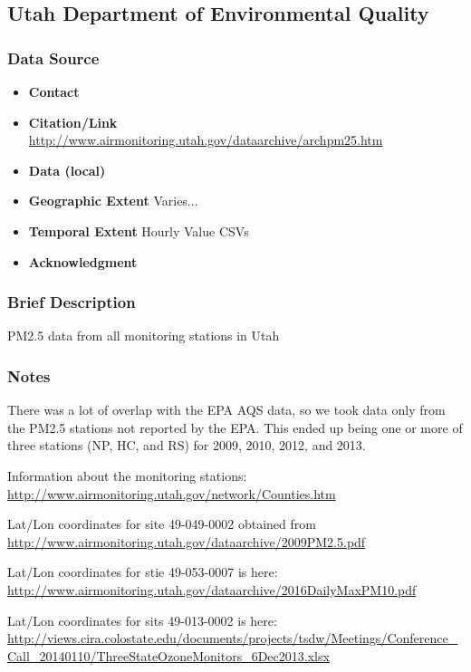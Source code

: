 \subsection{Utah Department of Environmental Quality }

\subsubsection*{Data Source}

\begin{itemize}[nolistsep]
\item \textbf{Contact} 
\item \textbf{Citation/Link} \url{http://www.airmonitoring.utah.gov/dataarchive/archpm25.htm}
\item \textbf{Data (local)} 
\item \textbf{Geographic Extent} Varies... 
\item \textbf{Temporal Extent} Hourly Value CSVs
\item \textbf{Acknowledgment} 
\end{itemize}

\subsubsection*{Brief Description} 
PM2.5 data from all monitoring stations in Utah

\subsubsection*{Notes} 
There was a lot of overlap with the EPA AQS data, so we took data only from the PM2.5 stations not reported by the EPA. 
This ended up being one or more of three stations (NP, HC, and RS) for 2009, 2010, 2012, and 2013.

Information about the monitoring stations: \url{ http://www.airmonitoring.utah.gov/network/Counties.htm } 

Lat/Lon coordinates for site 49-049-0002 obtained from \url{http://www.airmonitoring.utah.gov/dataarchive/2009PM2.5.pdf}

Lat/Lon coordinates for stie 49-053-0007 is here: \url{http://www.airmonitoring.utah.gov/dataarchive/2016DailyMaxPM10.pdf}

Lat/Lon coordinates for sits 49-013-0002 is here: \url{http://views.cira.colostate.edu/documents/projects/tsdw/Meetings/Conference_Call_20140110/ThreeStateOzoneMonitors_6Dec2013.xlsx}

